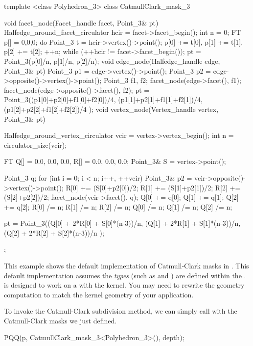 \begin{ccExampleCode}
template <class Polyhedron_3>
class CatmullClark_mask_3 {
  void facet_node(Facet_handle facet, Point_3& pt) {
    Halfedge_around_facet_circulator hcir = facet->facet_begin();
    int n = 0;
    FT p[] = {0,0,0};
    do {
      Point_3 t = hcir->vertex()->point();
      p[0] += t[0], p[1] += t[1], p[2] += t[2]; 
      ++n;
    } while (++hcir != facet->facet_begin());
    pt = Point_3(p[0]/n, p[1]/n, p[2]/n);
  }
  void edge_node(Halfedge_handle edge, Point_3& pt) {
    Point_3 p1 = edge->vertex()->point();
    Point_3 p2 = edge->opposite()->vertex()->point();
    Point_3 f1, f2;
    facet_node(edge->facet(), f1);
    facet_node(edge->opposite()->facet(), f2);
    pt = Point_3((p1[0]+p2[0]+f1[0]+f2[0])/4,
                 (p1[1]+p2[1]+f1[1]+f2[1])/4,
                 (p1[2]+p2[2]+f1[2]+f2[2])/4 );
  }
  void vertex_node(Vertex_handle vertex, Point_3& pt) {
    Halfedge_around_vertex_circulator vcir = vertex->vertex_begin();
    int n = circulator_size(vcir);    

    FT Q[] = {0.0, 0.0, 0.0}, R[] = {0.0, 0.0, 0.0};
    Point_3& S = vertex->point();
    
    Point_3 q;
    for (int i = 0; i < n; i++, ++vcir) {
      Point_3& p2 = vcir->opposite()->vertex()->point();
      R[0] += (S[0]+p2[0])/2;
      R[1] += (S[1]+p2[1])/2;
      R[2] += (S[2]+p2[2])/2;
      facet_node(vcir->facet(), q);
      Q[0] += q[0];      
      Q[1] += q[1];      
      Q[2] += q[2];
    }
    R[0] /= n;    R[1] /= n;    R[2] /= n;
    Q[0] /= n;    Q[1] /= n;    Q[2] /= n;
      
    pt = Point_3((Q[0] + 2*R[0] + S[0]*(n-3))/n,
                 (Q[1] + 2*R[1] + S[1]*(n-3))/n,
                 (Q[2] + 2*R[2] + S[2]*(n-3))/n );
  }
};
\end{ccExampleCode}

This example shows the default implementation of Catmull-Clark 
masks in .
This default implementation assumes the \emph{types} 
(such as  and ) are defined 
within the .  
is designed to work on a  with the  
kernel. You may need to rewrite the geometry computation
to match the kernel geometry of your application.

To invoke the Catmull-Clark subdivision method, we can 
simply call  with the Catmull-Clark masks
we just defined.

\begin{ccExampleCode}
PQQ(p, CatmullClark_mask_3<Polyhedron_3>(), depth);
\end{ccExampleCode}

